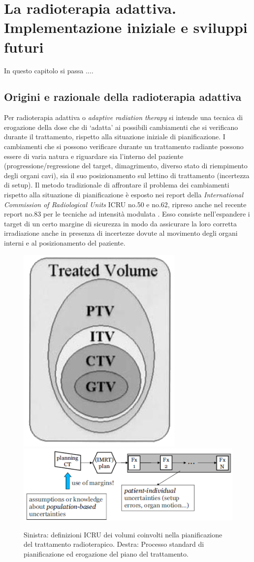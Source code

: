\chapter{La radioterapia adattiva. Implementazione iniziale e sviluppi futuri}
\minitoc
\textsf{In questo capitolo si passa ....}

\section{Origini e razionale della radioterapia adattiva}
Per radioterapia adattiva o \textit{adaptive radiation therapy} si intende una tecnica di erogazione della dose che di `adatta' ai possibili cambiamenti che si verificano durante il trattamento, rispetto alla situazione iniziale di pianificazione. I cambiamenti che si possono verificare durante un trattamento radiante possono essere di varia natura e riguardare sia l'interno del paziente (progressione/regressione del target, dimagrimento, diverso stato di riempimento degli organi cavi), sia il suo  posizionamento sul lettino di trattamento (incertezza di setup). Il metodo tradizionale di affrontare il problema dei cambiamenti rispetto alla situazione di pianificazione è esposto nei report della \textit{International Commission of Radiological Units} ICRU no.50 e no.62, ripreso anche nel recente report no.83 per le tecniche ad intensità modulata \cite{ICRU2010}. Esso consiste nell'espandere i target di un certo margine di sicurezza in modo da assicurare la loro corretta irradiazione anche in presenza di incertezze dovute al movimento degli organi interni e al posizionamento del paziente.
\begin{figure}
\centering
\includegraphics[width=.3\textwidth]{./cap3/ptv.png}
\includegraphics[width=.69\textwidth]{./cap3/adapt0.png}
\caption{Sinistra: definizioni ICRU dei volumi coinvolti nella pianificazione del trattamento radioterapico. Destra: Processo standard di pianificazione ed erogazione del piano del trattamento.}
\label{fig:adapt0}
\end{figure}

